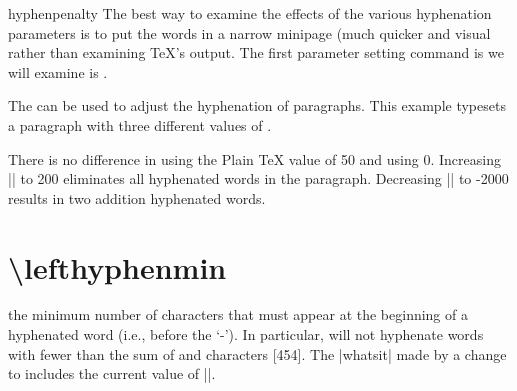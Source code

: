 \begin{docCommand}{hyphenpenalty}{}
The best way to examine the effects of the various hyphenation parameters
is to put the words in a narrow minipage (much quicker and visual rather than examining TeX's output. The first parameter setting command is we will examine is .
\end{docCommand}

\begin{texexample}{}{}
\end{texexample}



The  can be used to adjust the hyphenation of paragraphs. 
This example typesets a paragraph with three different values of . 

There is no difference in using the Plain TeX value of 50 and using 0. 
Increasing |\hyphenpenalty| to 200 eliminates all hyphenated words in the paragraph. 
Decreasing |\hyphenpenalty|  to -2000 results in two addition hyphenated words.






\section{\textbackslash lefthyphenmin}

 the minimum number of characters that must appear at the beginning of a hyphenated word (i.e., before the `-'). In particular, \tex will not hyphenate words with fewer than the sum of  and  characters [454]. The |whatsit|  made by a change to  includes the current value of |\lefthyphenmin|.

